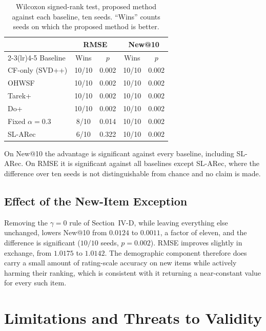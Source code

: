 \documentclass[conference]{IEEEtran}
\begin{document}
\begin{table}[t]
\caption{Wilcoxon signed-rank test, proposed method against each
baseline, ten seeds. ``Wins'' counts seeds on which the proposed
method is better.}
\label{tab:wilcoxon}
\centering
\small
\begin{tabular}{lcccc}
\toprule
 & \multicolumn{2}{c}{RMSE} & \multicolumn{2}{c}{New@10} \\
\cmidrule(lr){2-3}\cmidrule(lr){4-5}
Baseline & Wins & $p$ & Wins & $p$ \\
\midrule
CF-only (SVD++)    & 10/10 & 0.002 & 10/10 & 0.002 \\
OHWSF \cite{ohwsf2025} & 10/10 & 0.002 & 10/10 & 0.002 \\
Tarek+ \cite{tarek2022} & 10/10 & 0.002 & 10/10 & 0.002 \\
Do+ \cite{do2020}  & 10/10 & 0.002 & 10/10 & 0.002 \\
Fixed $\alpha=0.3$ & 8/10  & 0.014 & 10/10 & 0.002 \\
SL-ARec \cite{slarec2026} & 6/10 & 0.322 & 10/10 & 0.002 \\
\bottomrule
\end{tabular}
\end{table}

On New@10 the advantage is significant against every baseline,
including SL-ARec. On RMSE it is significant against all baselines
except SL-ARec, where the difference over ten seeds is not
distinguishable from chance and no claim is made.

\subsection{Effect of the New-Item Exception}

Removing the $\gamma = 0$ rule of Section~IV-D, while leaving
everything else unchanged, lowers New@10 from $0.0124$ to $0.0011$,
a factor of eleven, and the difference is significant
($10/10$ seeds, $p = 0.002$). RMSE improves slightly in exchange,
from $1.0175$ to $1.0142$. The demographic component therefore does
carry a small amount of rating-scale accuracy on new items while
actively harming their ranking, which is consistent with it
returning a near-constant value for every such item.

\section{Limitations and Threats to Validity}
\label{sec:threats}
\end{document}
